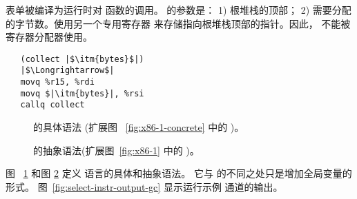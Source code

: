 \documentclass[11pt]{book}
\newcommand{\gray}[1]{{\color{gray} #1}}
\begin{document}
  表单被编译为运行时对 
函数的调用。  的参数是： 1) 根堆栈的顶部； 2) 需要分配的字节数。使用另一个专用寄存器  来存储指向根堆栈顶部的指针。因此，  不能被寄存器分配器使用。
\begin{lstlisting}
   (collect |$\itm{bytes}$|)
   |$\Longrightarrow$|
   movq %r15, %rdi
   movq $|\itm{bytes}|, %rsi
   callq collect
\end{lstlisting}



\begin{figure}[tp]
\fbox{
\begin{minipage}{0.96\textwidth}
\[
\begin{array}{lcl}
  \Arg &::=& \gray{ \key{\$}\Int \mid \key{\%}\Reg \mid \Int\key{(}\key{\%}\Reg\key{)} \mid \key{\%}\itm{bytereg} } \mid \Var \key{(\%rip)} \\
\LangXGlobal{} &::= & \gray{ \key{.globl main} }\\
      &    & \gray{ \key{main:} \; \Instr\ldots }
\end{array}
\]
\end{minipage}
}
\caption{ \LangXGlobal{} 的具体语法 (扩展图 ~\ref{fig:x86-1-concrete} 中的 \LangXIf{} )。}
\label{fig:x86-2-concrete}
\end{figure}

\begin{figure}[tp]
\fbox{
  \begin{minipage}{0.96\textwidth}
    \small
\[
\begin{array}{lcl}
  \Arg &::=&  \gray{  \INT{\Int} \mid \REG{\Reg} \mid \DEREF{\Reg}{\Int}
   \mid \BYTEREG{\Reg}} \\
   &\mid& (\key{Global}~\Var) \\
\LangXGlobal{} &::= & \gray{ \XPROGRAM{\itm{info}}{\LP\LP\itm{label} \,\key{.}\, \Block \RP\ldots\RP} }
\end{array}
\]
\end{minipage}
}
\caption{ \LangXGlobal{} 的抽象语法(扩展图~\ref{fig:x86-1} 中的 \LangXIf{} )。}
\label{fig:x86-2}
\end{figure}

图 ~\ref{fig:x86-2-concrete} 和图 \ref{fig:x86-2} 定义 \LangXGlobal{} 语言的具体和抽象语法。
它与 \LangXIf{} 的不同之处只是增加全局变量的形式。
%
图~\ref{fig:select-instr-output-gc} 显示运行示例 通道的输出。
\end{document}
